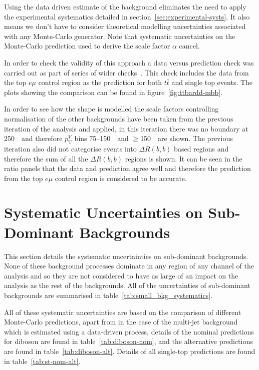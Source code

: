 Using the data driven estimate of the background eliminates the need to apply
the experimental systematics detailed in section~\ref{sec:experimental-systs}.
It also means we don't have to consider theoretical modelling uncertainties
associated with any Monte-Carlo generator. Note that systematic uncertainties on
the Monte-Carlo prediction used to derive the scale factor $\alpha$ cancel.

In order to check the validity of this approach a data versus prediction check
was carried out as part of series of wider checks~\cite{VHModellingNote2019}.
This check includes the data from the top $e\mu$ control region as the
prediction for both $t\bar{t}$ and single top events. The plots showing the
comparison can be found in figure~\ref{fig:ttbardd-mbb}.

In order to see how the shape is modelled the scale factors controlling
normalisation of the other backgrounds have been taken from the previous
iteration of the analysis and applied, in this iteration there was no boundary
at 250~\GeV\ and therefore $p_{\mathrm{T}}^V$ bins 75--150~\GeV\ and
$\geq$150~\GeV\ are shown. The previous iteration also did not categorise events
into $\Delta R(b,b)$ based regions and therefore the sum of all the $\Delta
R(b,b)$ regions is shown. It can be seen in the ratio panels that the data and
prediction agree well and therefore the prediction from the top $e\mu$ control
region is considered to be accurate.

\clearpage
\newpage

\section{Systematic Uncertainties on Sub-Dominant Backgrounds}

This section details the systematic uncertainties on sub-dominant backgrounds.
None of these background processes dominate in any region of any channel of the
analysis and so they are not considered to have as large of an impact on the
analysis as the rest of the backgrounds. All of the uncertainties of
sub-dominant backgrounds are summarised in
table~\ref{tab:small_bkg_systematics}.

All of these systematic uncertainties are based on the comparison of different
Monte-Carlo predictions, apart from in the case of the multi-jet background
which is estimated using a data-driven process, details of the nominal
predictions for diboson are found in table~\ref{tab:diboson-nom}, and the
alternative predictions are found in table~\ref{tab:diboson-alt}. Details of all
single-top predictions are found in table~\ref{tab:st-nom-alt}.

